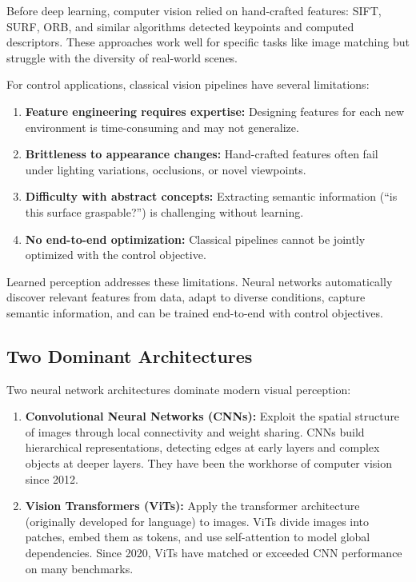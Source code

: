 Before deep learning, computer vision relied on hand-crafted features: SIFT, SURF, ORB, and similar algorithms detected keypoints and computed descriptors. These approaches work well for specific tasks like image matching but struggle with the diversity of real-world scenes.

For control applications, classical vision pipelines have several limitations:

\begin{enumerate}
    \item \textbf{Feature engineering requires expertise:} Designing features for each new environment is time-consuming and may not generalize.

    \item \textbf{Brittleness to appearance changes:} Hand-crafted features often fail under lighting variations, occlusions, or novel viewpoints.

    \item \textbf{Difficulty with abstract concepts:} Extracting semantic information (``is this surface graspable?'') is challenging without learning.

    \item \textbf{No end-to-end optimization:} Classical pipelines cannot be jointly optimized with the control objective.
\end{enumerate}

Learned perception addresses these limitations. Neural networks automatically discover relevant features from data, adapt to diverse conditions, capture semantic information, and can be trained end-to-end with control objectives.

\subsection{Two Dominant Architectures}

Two neural network architectures dominate modern visual perception:

\begin{enumerate}
    \item \textbf{Convolutional Neural Networks (CNNs):} Exploit the spatial structure of images through local connectivity and weight sharing. CNNs build hierarchical representations, detecting edges at early layers and complex objects at deeper layers. They have been the workhorse of computer vision since 2012.

    \item \textbf{Vision Transformers (ViTs):} Apply the transformer architecture (originally developed for language) to images. ViTs divide images into patches, embed them as tokens, and use self-attention to model global dependencies. Since 2020, ViTs have matched or exceeded CNN performance on many benchmarks.
\end{enumerate}

